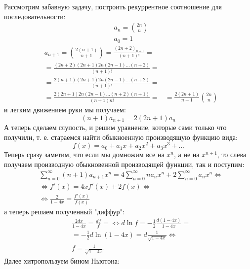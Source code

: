 Рассмотрим забавную задачу, построить рекуррентное соотношение для последовательности:
\[
	\begin{split}
		& a_n = \binom{2n}{n} \\
		& a_0 = 1
	\end{split}
\]
\[
	\begin{split}
		& a_{n+1} = \binom{2\left(n+1\right)}{n+1} = \frac{{\left(2 n + 2\right)}_{n + 1}}{\left(n + 1\right)!} = \\
		& = \frac{\left(2 n + 2\right)\left(2 n + 1\right) 2 n \left(2 n - 1\right)...\left(n + 2\right)}{\left(n+1\right)!} = \\
		& = \frac{2 \left(n+1\right)\left(2 n + 1\right) 2 n \left(2 n - 1\right) ... \left(n + 2\right)}{\left(n+1\right)!} = \\
		& = \frac{2 \left(2 n + 1\right) 2 n \left(2 n - 1\right) ... \left(n + 2\right)\left(n + 1\right)}{\left(n+1\right) n!} = 
		& = \frac{2 \left(2n+1\right)}{n+1} \binom{2n}{n}
	\end{split}
\]
и легким движением руки мы получаем:
\[
	\left(n+1\right) a_{n+1} = 2 \left(2 n + 1\right) a_n
\]
 А теперь сделаем глупость, и решим уравнение, которые сами только что получили, т. е. стараемся найти обыкноенную производящую функцию вида:
\[
	f\left(x\right) = a_0 + a_1 x + a_2 x^2 + a_3 x^3 + ...
\]
Теперь сразу заметим, что если мы домножим все на $x^n$, а не на $x^{n+1}$, то слева получаем производную обыкновенной производящей функции, так и поступим:
\[
	\begin{split}
		& \sum_{n=0}^{\infty} \left(n+1\right) a_{n+1} x^n = 4 \sum_{n=0}^{\infty} n a_n x^n + 2 \sum_{n=0}^{\infty} a_n x^n \Leftrightarrow \\
		& \Leftrightarrow f'\left(x\right) = 4 x f'\left(x\right) + 2 f\left(x\right) \Leftrightarrow \\
		& \Leftrightarrow \frac{2}{1 - 4 x} = \frac{f'\left(x\right)}{f \left(x\right)}
	\end{split}
\]
а теперь решаем полученный "диффур":
\[
	\begin{split}
		& \frac{2 dx}{1 - 4 x} = \frac{d f}{f} = \Leftrightarrow d \ln f = -\frac{1}{2} \frac{d \left(1 - 4 x\right)}{1 - 4 x} = \\
		& = -\frac{1}{2} d \ln \left(1 - 4 x\right) = d \frac{1}{\sqrt{1 - 4 x}} \Leftrightarrow \\
		& f = \frac{1}{\sqrt{1 - 4 x}}
	\end{split}
\]
Далее хитропользуем бином Ньютона:
